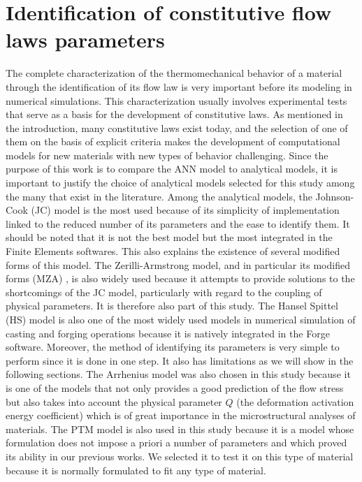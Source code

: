 \documentclass[twoside,english,1p,final,sort&compress]{elsarticle}
\theoremstyle{plain}
\begin{document}
\section{Identification of constitutive flow laws parameters\label{sec:ConstLaws}}

The complete characterization of the thermomechanical behavior of a material through the identification of its flow law is very important before its modeling in numerical simulations.
This characterization usually involves experimental tests that serve as a basis for the development of constitutive laws.
As mentioned in the introduction, many constitutive laws exist today, and the selection of one of them on the basis of explicit criteria makes the development of computational models for new materials with new types of behavior challenging.
Since the purpose of this work is to compare the ANN model to analytical models, it is important to justify the choice of analytical models selected for this study among the many that exist in the literature.
Among the analytical models, the Johnson-Cook (JC) model \cite{Johnson-1983} is the most used because of its simplicity of implementation linked to the reduced number of its parameters and the ease to identify them.
It should be noted that it is not the best model but the most integrated in the Finite Elements softwares.
This also explains the existence of several modified forms of this model.
The Zerilli-Armstrong model, and in particular its modified forms (MZA) \cite{NematNasser-2004, Lennon-2004, Muralli-2017, Cheng-2021, Muralli-2021}, is also widely used because it attempts to provide solutions to the shortcomings of the JC model, particularly with regard to the coupling of physical parameters.
It is therefore also part of this study.
The Hansel Spittel (HS) model \cite{Hensel-1978} is also one of the most widely used models in numerical simulation of casting and forging operations because it is natively integrated in the Forge software.
Moreover, the method of identifying its parameters is very simple to perform since it is done in one step.
It also has limitations as we will show in the following sections.
The Arrhenius model was also chosen in this study because it is one of the models that not only provides a good prediction of the flow stress but also takes into account the physical parameter $Q$ (the deformation activation energy coefficient) which is of great importance in the microstructural analyses of materials.
The PTM model \cite{TizeMha-2022} is also used in this study because it is a model whose formulation does not impose a priori a number of parameters and which proved its ability in our previous works.
We selected it to test it on this type of material because it is normally formulated to fit any type of material.
\end{document}

